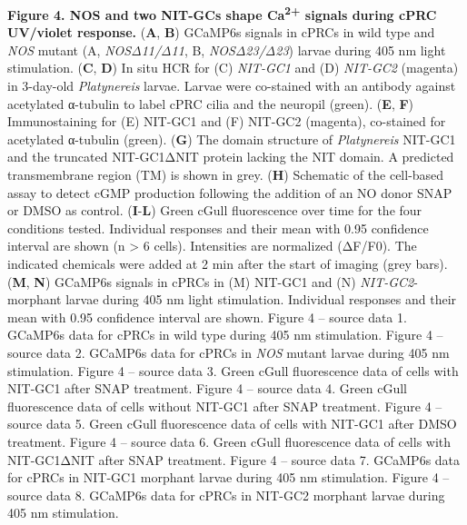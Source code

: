 \documentclass[
  11pt,
  letterpaper,
  DIV=11,
  numbers=noendperiod]{scrartcl}
\begin{document}
\textbf{Figure 4. NOS and two NIT-GCs shape Ca\textsuperscript{2+}
signals during cPRC UV/violet response.} (\textbf{A}, \textbf{B})
GCaMP6s signals in cPRCs in wild type and \emph{NOS} mutant (A,
\emph{NOSΔ11/Δ11}, B, \emph{NOSΔ23/Δ23}) larvae during 405 nm light
stimulation. (\textbf{C}, \textbf{D}) In situ HCR for (C) \emph{NIT-GC1}
and (D) \emph{NIT-GC2} (magenta) in 3-day-old \emph{Platynereis} larvae.
Larvae were co-stained with an antibody against acetylated α-tubulin to
label cPRC cilia and the neuropil (green). (\textbf{E}, \textbf{F})
Immunostaining for (E) NIT-GC1 and (F) NIT-GC2 (magenta), co-stained for
acetylated α-tubulin (green). (\textbf{G}) The domain structure of
\emph{Platynereis} NIT-GC1 and the truncated NIT-GC1ΔNIT protein lacking
the NIT domain. A predicted transmembrane region (TM) is shown in grey.
(\textbf{H}) Schematic of the cell-based assay to detect cGMP production
following the addition of an NO donor SNAP or DMSO as control.
(\textbf{I}-\textbf{L}) Green cGull fluorescence over time for the four
conditions tested. Individual responses and their mean with 0.95
confidence interval are shown (n \textgreater{} 6 cells). Intensities
are normalized (ΔF/F0). The indicated chemicals were added at 2 min
after the start of imaging (grey bars). (\textbf{M}, \textbf{N}) GCaMP6s
signals in cPRCs in (M) NIT-GC1 and (N) \emph{NIT-GC2}-morphant larvae
during 405 nm light stimulation. Individual responses and their mean
with 0.95 confidence interval are shown. Figure 4 -- source data 1.
GCaMP6s data for cPRCs in wild type during 405 nm stimulation. Figure 4
-- source data 2. GCaMP6s data for cPRCs in \emph{NOS} mutant larvae
during 405 nm stimulation. Figure 4 -- source data 3. Green cGull
fluorescence data of cells with NIT-GC1 after SNAP treatment. Figure 4
-- source data 4. Green cGull fluorescence data of cells without NIT-GC1
after SNAP treatment. Figure 4 -- source data 5. Green cGull
fluorescence data of cells with NIT-GC1 after DMSO treatment. Figure 4
-- source data 6. Green cGull fluorescence data of cells with
NIT-GC1ΔNIT after SNAP treatment. Figure 4 -- source data 7. GCaMP6s
data for cPRCs in NIT-GC1 morphant larvae during 405 nm stimulation.
Figure 4 -- source data 8. GCaMP6s data for cPRCs in NIT-GC2 morphant
larvae during 405 nm stimulation.
\end{document}
